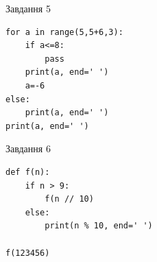 \documentclass[12pt, ukrainian]{article}
\begin{document}
{\vspace{15mm}
\begin{minipage}[t]{9.7cm}                
{\begin{center}Завдання {5}\end{center}}
\begin{verbatim}
for a in range(5,5+6,3):
    if a<=8:
        pass
    print(a, end=' ')
    a=-6
else:
    print(a, end=' ')
print(a, end=' ')
\end{verbatim}     
\end{minipage}
\vline \hspace{8mm}
\begin{minipage}[t]{8.0cm}                
{\begin{center}Завдання {6}\end{center}}
\begin{verbatim}
def f(n):
    if n > 9:
        f(n // 10)
    else:
        print(n % 10, end=' ')

f(123456)
\end{verbatim}     
\end{minipage}

}
\newpage
\end{document}

